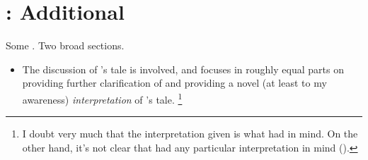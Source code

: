 \chapter{: Additional }
\label{cha:zS:sec:question:illu}

\begin{note}
  Some .
  Two broad sections.

  \begin{itemize}
  \item
    The discussion of \citeauthor{Carroll:1895uj}'s tale is involved, and focuses in roughly equal parts on providing further clarification of  and providing a novel (at least to my awareness) \emph{interpretation} of \citeauthor{Carroll:1895uj}'s tale.%
    \footnote{
      I doubt very much that the interpretation given is what \citeauthor{Carroll:1895uj} had in mind.
      On the other hand, it's not clear that \citeauthor{Carroll:1895uj} had any particular interpretation in mind (\cite[Cf.][]{Thomson:2010tt}).
    }
  \end{itemize}
\end{note}






